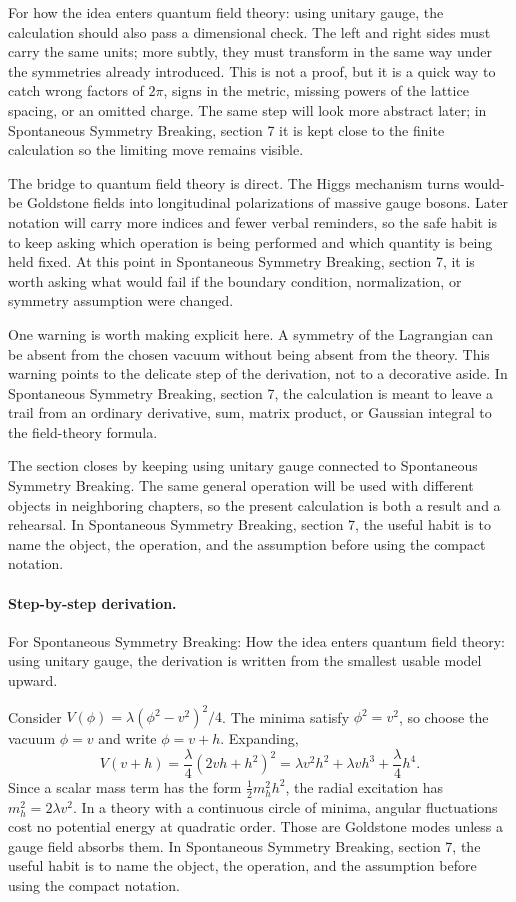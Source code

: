 For how the idea enters quantum field theory: using unitary gauge, the calculation should also pass a dimensional check.  The left and right sides must carry the same units; more subtly, they must transform in the same way under the symmetries already introduced.  This is not a proof, but it is a quick way to catch wrong factors of \(2\pi\), signs in the metric, missing powers of the lattice spacing, or an omitted charge.  The same step will look more abstract later; in Spontaneous Symmetry Breaking, section 7 it is kept close to the finite calculation so the limiting move remains visible.

The bridge to quantum field theory is direct.  The Higgs mechanism turns would-be Goldstone fields into longitudinal polarizations of massive gauge bosons.  Later notation will carry more indices and fewer verbal reminders, so the safe habit is to keep asking which operation is being performed and which quantity is being held fixed.  At this point in Spontaneous Symmetry Breaking, section 7, it is worth asking what would fail if the boundary condition, normalization, or symmetry assumption were changed.

One warning is worth making explicit here.  A symmetry of the Lagrangian can be absent from the chosen vacuum without being absent from the theory.  This warning points to the delicate step of the derivation, not to a decorative aside.  In Spontaneous Symmetry Breaking, section 7, the calculation is meant to leave a trail from an ordinary derivative, sum, matrix product, or Gaussian integral to the field-theory formula.

The section closes by keeping using unitary gauge connected to Spontaneous Symmetry Breaking.  The same general operation will be used with different objects in neighboring chapters, so the present calculation is both a result and a rehearsal.  In Spontaneous Symmetry Breaking, section 7, the useful habit is to name the object, the operation, and the assumption before using the compact notation.



\paragraph{Step-by-step derivation.}

For Spontaneous Symmetry Breaking: How the idea enters quantum field theory: using unitary gauge, the derivation is written from the smallest usable model upward.

Consider \(V(\phi)=\lambda(\phi^2-v^2)^2/4\).  The minima satisfy \(\phi^2=v^2\), so choose the vacuum \(\phi=v\) and write \(\phi=v+h\).  Expanding,
\[
  V(v+h)=\frac{\lambda}{4}(2vh+h^2)^2
  =\lambda v^2h^2+\lambda vh^3+\frac{\lambda}{4}h^4.
\]
Since a scalar mass term has the form \(\frac12m_h^2h^2\), the radial excitation has \(m_h^2=2\lambda v^2\).  In a theory with a continuous circle of minima, angular fluctuations cost no potential energy at quadratic order.  Those are Goldstone modes unless a gauge field absorbs them.  In Spontaneous Symmetry Breaking, section 7, the useful habit is to name the object, the operation, and the assumption before using the compact notation.

